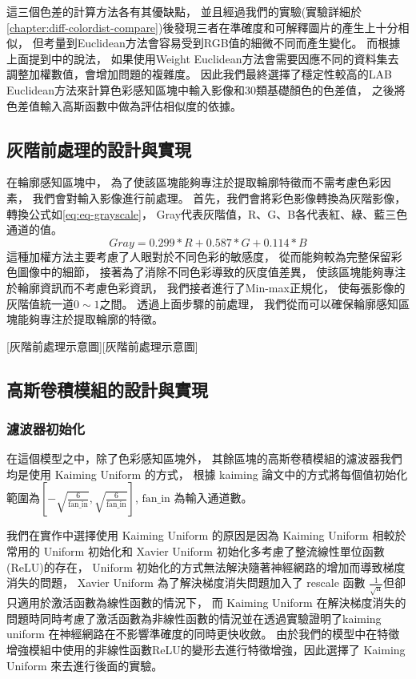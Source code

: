 \documentclass[class=NCU_thesis, crop=false]{standalone}
\begin{document}
			這三個色差的計算方法各有其優缺點，
			並且經過我們的實驗(實驗詳細於\cref{chapter:diff-colordist-compare})後發現三者在準確度和可解釋圖片的產生上十分相似，
			但考量到Euclidean方法會容易受到RGB值的細微不同而產生變化。
			而根據上面提到\cite{LABformula}中的說法，
			如果使用Weight Euclidean方法會需要因應不同的資料集去調整加權數值，會增加問題的複雜度。
			因此我們最終選擇了穩定性較高的LAB Euclidean方法來計算色彩感知區塊中輸入影像和30類基礎顏色的色差值，
			之後將色差值輸入高斯函數中做為評估相似度的依據。

	\subsection{灰階前處理的設計與實現}
		在輪廓感知區塊中，
		為了使該區塊能夠專注於提取輪廓特徵而不需考慮色彩因素，
		我們會對輸入影像進行前處理。
		首先，我們會將彩色影像轉換為灰階影像，
		轉換公式如\cref{eq:eq-grayscale}，
		Gray代表灰階值，R、G、B各代表紅、綠、藍三色通道的值。
		\begin{equation}
		    \label{eq:eq-grayscale}
		    Gray = 0.299 * R + 0.587 * G + 0.114 * B
		\end{equation}
		這種加權方法主要考慮了人眼對於不同色彩的敏感度，
		從而能夠較為完整保留彩色圖像中的細節，
		接著為了消除不同色彩導致的灰度值差異，
		使該區塊能夠專注於輪廓資訊而不考慮色彩資訊，
		我們接者進行了Min-max正規化，
		使每張影像的灰階值統一道$0\sim1$之間。
		透過上面步驟的前處理，
		我們從而可以確保輪廓感知區塊能夠專注於提取輪廓的特徵。

		[灰階前處理示意圖][灰階前處理示意圖]

	\subsection{高斯卷積模組的設計與實現}
		\subsubsection{濾波器初始化}
			在這個模型之中，除了色彩感知區塊外，
			其餘區塊的高斯卷積模組的濾波器我們均是使用 Kaiming Uniform 的方式，
			根據 kaiming 論文\cite{DBLP:journals/corr/HeZR015}中的方式將每個值初始化範圍為$[-\sqrt{\frac{6}{\text{fan\_in}}}, \sqrt{\frac{6}{\text{fan\_in}}}]$,
			$\text{fan\_in}$ 為輸入通道數。

			我們在實作中選擇使用 Kaiming Uniform 的原因是因為 Kaiming Uniform 相較於常用的 Uniform 初始化和 Xavier Uniform\cite{pmlr-v9-glorot10a} 初始化多考慮了整流線性單位函數(ReLU)的存在，
			Uniform 初始化的方式無法解決隨著神經網路的增加而導致梯度消失的問題，
			Xavier Uniform 為了解決梯度消失問題加入了 rescale 函數 $\frac{1}{\sqrt{\text{n}}}$但卻只適用於激活函數為線性函數的情況下，
			而 Kaiming Uniform 在解決梯度消失的問題時同時考慮了激活函數為非線性函數的情況並在\cite{DBLP:journals/corr/HeZR015}透過實驗證明了kaiming uniform 在神經網路在不影響準確度的同時更快收斂。
			由於我們的模型中在特徵增強模組中使用的非線性函數ReLU的變形去進行特徵增強，因此選擇了 Kaiming Uniform 來去進行後面的實驗。
\end{document}

